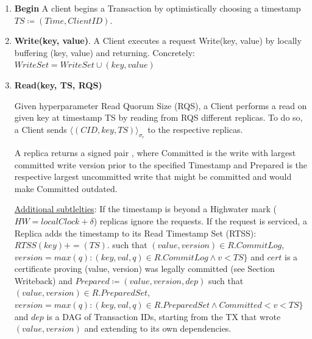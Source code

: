 \begin{enumerate}
\item \textbf{Begin} A client begins a Transaction by optimistically choosing a timestamp $TS \coloneqq (Time, Client ID)$. 
\item \textbf{Write(key, value)}. A Client executes a request Write(key, value) by locally buffering (key, value) and returning. Concretely: $WriteSet = WriteSet \cup (key, value)$


\item \textbf{Read(key, TS, RQS)} 

Given hyperparameter Read Quorum Size (RQS), a Client performs a read on given key at timestamp TS by reading from RQS different replicas. To do so, a Client sends $\langle(CID, key, TS)\rangle_{\sigma_c}$  to the respective replicas.\\


A replica returns a signed pair , where Committed is the write with largest committed write version prior to the specified Timestamp and Prepared is the respective largest uncommitted write that might be committed and would make Committed outdated. 

\underline{Additional subtlelties}: If the timestamp is beyond a Highwater mark ($HW = localClock + \delta$) replicas ignore the requests. If the request is serviced, a Replica adds the timestamp to its Read Timestamp Set (RTSS): $RTSS(key) += (TS)$.  such that $ (value, version) \in R.CommitLog$, $version = max(q) : (key, val, q) \in R.CommitLog \land v < TS \}$ and $cert$ is a certificate proving (value, version) was legally committed (see Section Writeback) and 
 $Prepared \coloneqq (value, version, dep)$ such that $(value, version) \in R.PreparedSet$, $version = max(q) : (key, val, q) \in R.PreparedSet \land Committed < v < TS \}$ and $dep$ is a DAG of Transaction IDs, starting from the TX that wrote $(value, version)$ and extending to its own dependencies.


\end{enumerate}
